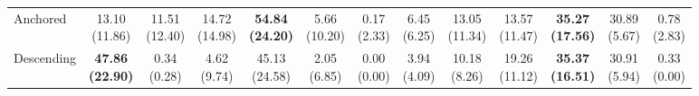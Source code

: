 {\begin{tabular}{l|cccccc|cccccc}
Anchored & \makecell{13.10 \\ (11.86)} & \makecell{11.51 \\ (12.40)} & \makecell{14.72 \\ (14.98)} & {\cellcolor[HTML]{C8E6C9}} \bfseries \makecell{54.84 \\ (24.20)} & \makecell{5.66 \\ (10.20)} & \makecell{0.17 \\ (2.33)} & \makecell{6.45 \\ (6.25)} & \makecell{13.05 \\ (11.34)} & \makecell{13.57 \\ (11.47)} & {\cellcolor[HTML]{C8E6C9}} \bfseries \makecell{35.27 \\ (17.56)} & \makecell{30.89 \\ (5.67)} & \makecell{0.78 \\ (2.83)} \\
Descending & \bfseries \makecell{47.86 \\ (22.90)} & \makecell{0.34 \\ (0.28)} & \makecell{4.62 \\ (9.74)} & {\cellcolor[HTML]{C8E6C9}} \makecell{45.13 \\ (24.58)} & \makecell{2.05 \\ (6.85)} & \makecell{0.00 \\ (0.00)} & \makecell{3.94 \\ (4.09)} & \makecell{10.18 \\ (8.26)} & \makecell{19.26 \\ (11.12)} & {\cellcolor[HTML]{C8E6C9}} \bfseries \makecell{35.37 \\ (16.51)} & \makecell{30.91 \\ (5.94)} & \makecell{0.33 \\ (0.00)} \\
\bottomrule
\end{tabular}
}%
